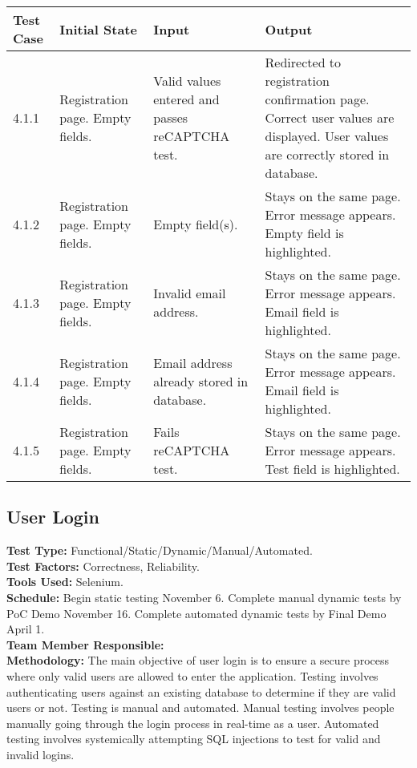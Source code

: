 \documentclass[12pt]{article}
\begin{document}
\begin{longtable}{|p{2cm}|p{3cm}|p{5cm}|p{5cm}|}
\hline
\textbf{Test Case}  & \textbf{Initial State} & \textbf{Input} & \textbf{Output} \\ \hline
4.1.1 & Registration page. Empty fields. & Valid values entered and passes reCAPTCHA test. & Redirected to registration confirmation page. Correct user values are displayed. User values are correctly stored in database. \\ 
\hline
4.1.2 & Registration page. Empty fields. & Empty field(s). & Stays on the same page. Error message appears. Empty field is highlighted. \\
\hline
4.1.3 & Registration page. Empty fields. & Invalid email address. & Stays on the same page. Error message appears. Email field is highlighted. \\
\hline
4.1.4 & Registration page. Empty fields. & Email address already stored in database. & Stays on the same page. Error message appears. Email field is highlighted. \\
\hline
4.1.5 & Registration page. Empty fields. & Fails reCAPTCHA test. & Stays on the same page. Error message appears. Test field is highlighted. \\
\hline
\end{longtable}



\subsection{User Login}
\textbf{Test Type:} Functional/Static/Dynamic/Manual/Automated. \\
\textbf{Test Factors:} Correctness, Reliability. \\
\textbf{Tools Used:} Selenium. \\
\textbf{Schedule:} Begin static testing November 6. Complete manual dynamic tests by PoC Demo November 16. Complete automated dynamic tests by Final Demo April 1. \\
\textbf{Team Member Responsible:} \\
\textbf{Methodology:} The main objective of user login is to ensure a secure process where only valid users are allowed to enter the application. Testing involves authenticating users against an existing database to determine if they are valid users or not. Testing is manual and automated. Manual testing involves people manually going through the login process in real-time as a user. Automated testing involves systemically attempting SQL injections to test for valid and invalid logins.
\end{document}
